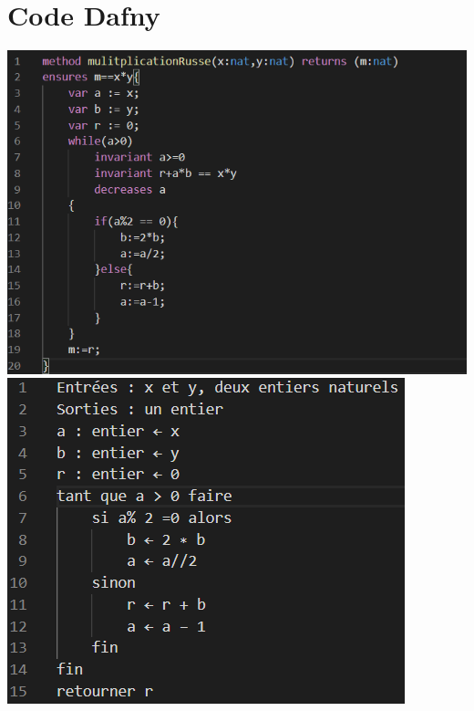 \documentclass[12pt,a4paper]{report}
\begin{document}
\section{Code Dafny}
\includegraphics[scale=0.36]{algoDafny} 
\includegraphics[scale=0.5]{algoRusse} 
\end{document}
